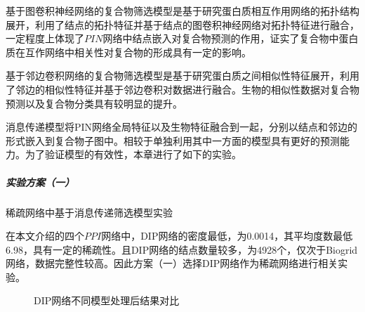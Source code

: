 基于图卷积神经网络的复合物筛选模型是基于研究蛋白质相互作用网络的拓扑结构展开，利用了结点的拓扑特征并基于结点的图卷积神经网络对拓扑特征进行融合，一定程度上体现了$PIN$网络中结点嵌入对复合物预测的作用，证实了复合物中蛋白质在互作网络中相关性对复合物的形成具有一定的影响。

基于邻边卷积网络的复合物筛选模型是基于研究蛋白质之间相似性特征展开，利用了邻边的相似性特征并基于邻边卷积对数据进行融合。生物的相似性数据对复合物预测以及复合物分类具有较明显的提升。

消息传递模型将PIN网络全局特征以及生物特征融合到一起，分别以结点和邻边的形式嵌入到复合物子图中。相较于单独利用其中一方面的模型具有更好的预测能力。为了验证模型的有效性，本章进行了如下的实验。


\subparagraph*{实验方案（一）} 稀疏网络中基于消息传递筛选模型实验

在本文介绍的四个$PPI$网络中，DIP网络的密度最低，为0.0014，其平均度数最低6.98，具有一定的稀疏性。且DIP网络的结点数量较多，为4928个，仅次于Biogrid网络，数据完整性较高。因此方案（一）选择DIP网络作为稀疏网络进行相关实验。

\begin{figure}[htbp]
    \centering
    \vskip0.2cm
    \caption{DIP网络不同模型处理后结果对比}
    \label{fig:result/DIP/fusion}
\end{figure}


